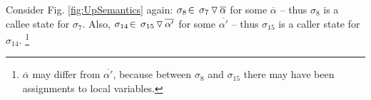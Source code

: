  

 {Consider Fig. \ref{fig:UpSemantics} again: $\sigma_8\!\in\!   \PushS  {\alpha} {\sigma_7}$ for some $\overline \alpha$ -- {thus $\sigma_8$ is a callee state for 
 $\sigma_7$}. Also, 
 $\sigma_{14}\!\in\!\PushS  {\alpha'} {\sigma_{15}}$ for some $\overline {\alpha'}$ -- {thus $\sigma_{15}$ is a caller state for 
 $\sigma_{14}$}.
\footnote{ $\overline \alpha$ may differ from $\overline {\alpha'}$, because between $\sigma_8$ and $\sigma_{15}$ there may 
 have been assignments to local variables.} %
}

 
%
% 
% 
% 
%
